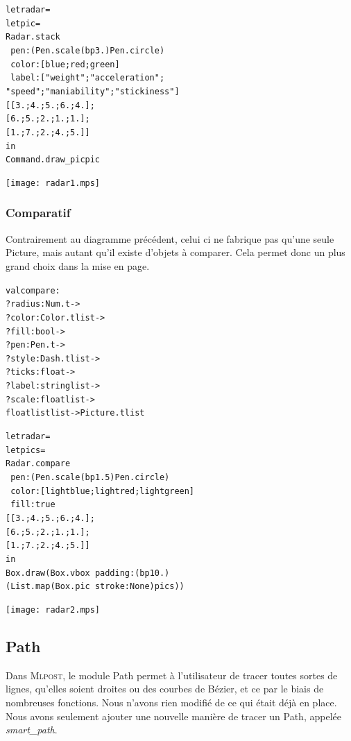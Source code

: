 \documentclass[a4paper,12pt]{article}
\newcommand{\mlpost}{\textsc{Mlpost}}
\begin{document}
\bigskip

\begin{minipage}{0.5\linewidth}
  \begin{alltt}
    let radar =
    let pic =
    Radar.stack
    ~pen:(Pen.scale (bp 3.) Pen.circle)
    ~color:[blue;red;green]
    ~label:["weight";"acceleration";
      "speed";"maniability";"stickiness"]
    [[3.;4.;5.;6.;4.];
      [6.;5.;2.;1.;1.];
      [1.;7.;2.;4.;5.]]
    in
    Command.draw_pic pic
  \end{alltt}
\end{minipage}
\begin{minipage}{0.5\linewidth}
\begin{center}
\texttt{[image: radar1.mps]}
\end{center}
\end{minipage}

\subsubsection{Comparatif}
Contrairement au diagramme précédent, celui ci ne fabrique pas qu'une seule Picture, mais autant qu'il existe d'objets à comparer. Cela permet donc un plus grand choix dans la mise en page.
\begin{alltt}
 val compare :
 ?radius:Num.t ->
 ?color:Color.t list ->
 ?fill:bool ->
 ?pen:Pen.t ->
 ?style:Dash.t list ->
 ?ticks:float ->
 ?label:string list ->
 ?scale:float list ->
 float list list -> Picture.t list
\end{alltt}


\bigskip

\begin{minipage}{0.5\linewidth}
  \begin{alltt}
    let radar =
    let pics =
    Radar.compare
    ~pen:(Pen.scale (bp 1.5) Pen.circle)
    ~color:[lightblue;lightred;lightgreen] 
    ~fill:true
    [[3.;4.;5.;6.;4.];
      [6.;5.;2.;1.;1.];
      [1.;7.;2.;4.;5.]]
    in
    Box.draw (Box.vbox ~padding:(bp 10.) 
    (List.map (Box.pic ~stroke:None) pics))

  \end{alltt}
\end{minipage}
\begin{minipage}{0.5\linewidth}
\begin{center}
\texttt{[image: radar2.mps]}
\end{center}
\end{minipage}

\subsection{Path}
Dans \mlpost, le module Path permet à l'utilisateur de tracer toutes sortes de lignes, qu'elles soient droites ou des courbes de Bézier, et ce par le biais de nombreuses fonctions.
Nous n'avons rien modifié de ce qui était déjà en place. Nous avons seulement ajouter une nouvelle manière de tracer un Path, appelée \textit{smart\_path}. 
\end{document}
